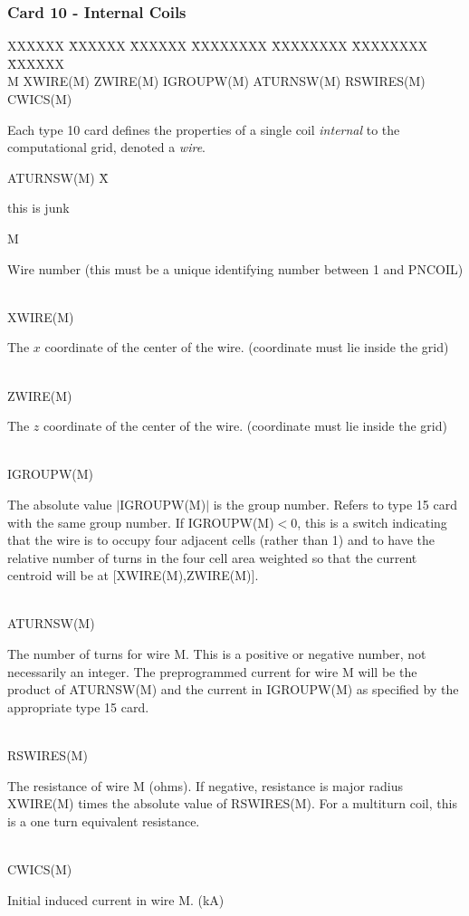 \newpage \subsubsection{Card 10 - Internal Coils} 
\begin{tabbing} 
XXXXXX \= XXXXXX \= XXXXXX \= XXXXXXXX \= XXXXXXXX \=
XXXXXXXX \= XXXXXX        \\ 
\footnotesize M \>\footnotesize XWIRE(M) \>\footnotesize ZWIRE(M) \>\footnotesize
IGROUPW(M) \>\footnotesize ATURNSW(M) \>\footnotesize RSWIRES(M) \>\footnotesize
CWICS(M) 
\end{tabbing} 
Each type 10 card defines the properties of a single coil {\em internal} to the computational grid,
denoted a {\em wire}.\\ 
\begin{tabbing} 
ATURNSW(M) X\= \parbox[t]{\width}{this is junk} \kill 
M \> \parbox[t]{\width}{Wire number (this must be a unique identifying number between 1 and
PNCOIL)}\\ 
XWIRE(M) \> \parbox[t]{\width}{The $x$ coordinate of the center of the wire. (coordinate
must lie inside the grid)}\\ 
ZWIRE(M) \> \parbox[t]{\width}{The $z$ coordinate of the center of the wire. (coordinate
must lie inside the grid)}\\ 
IGROUPW(M) \> \parbox[t]{\width}{The absolute value $\mid$IGROUPW(M)$\mid$ is the
group
number.  Refers to type 15 card with the same group number.  If IGROUPW(M)$<$0, this is a
switch indicating that the wire is to occupy four adjacent cells (rather than 1) and to have the
relative number of turns in the four cell area weighted so that the current centroid will be at
[XWIRE(M),ZWIRE(M)].}\\ 
ATURNSW(M) \> \parbox[t]{\width}{The number of turns for wire M.  This is a positive or
negative number, not necessarily an integer.  The preprogrammed current for wire M will be the
product of ATURNSW(M) and the current in IGROUPW(M) as specified by the appropriate type
15 card.}\\ 
RSWIRES(M) \> \parbox[t]{\width}{The resistance of wire M (ohms).  If negative, resistance
is
major radius XWIRE(M) times the absolute value of RSWIRES(M).  For a multiturn coil, this
is
a one turn equivalent resistance.}\\ 
CWICS(M) \> \parbox[t]{\width}{Initial induced current in wire M. (kA)}\\ 
\end{tabbing}
